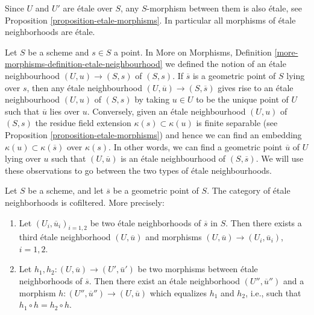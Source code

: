 \begin{remark}
\label{remark-etale-between-etale}
Since $U$ and $U'$ are \'etale over $S$, any $S$-morphism
between them is also \'etale, see
Proposition \ref{proposition-etale-morphisms}.
In particular all morphisms of \'etale neighborhoods are \'etale.
\end{remark}

\begin{remark}
\label{remark-etale-neighbourhoods}
Let $S$ be a scheme and $s \in S$ a point. In
More on Morphisms,
Definition \ref{more-morphisms-definition-etale-neighbourhood}
we defined the notion of an \'etale neighbourhood $(U, u) \to (S, s)$
of $(S, s)$. If $\overline{s}$ is a geometric point of $S$ lying over
$s$, then any \'etale neighbourhood $(U, \overline{u}) \to (S, \overline{s})$
gives rise to an \'etale neighbourhood $(U, u)$ of $(S, s)$ by taking
$u \in U$ to be the unique point of $U$ such that $\overline{u}$
lies over $u$. Conversely, given an \'etale neighbourhood $(U, u)$
of $(S, s)$ the residue field extension $\kappa(s) \subset \kappa(u)$
is finite separable (see
Proposition \ref{proposition-etale-morphisms})
and hence we can find an embedding $\kappa(u) \subset \kappa(\overline{s})$
over $\kappa(s)$. In other words, we can find a geometric point
$\overline{u}$ of $U$ lying over $u$ such that $(U, \overline{u})$
is an \'etale neighbourhood of $(S, \overline{s})$.
We will use these observations to go between the two types of
\'etale neighbourhoods.
\end{remark}

\begin{lemma}
\label{lemma-cofinal-etale}
Let $S$ be a scheme, and let $\overline{s}$ be a geometric point of $S$.
The category of \'etale neighborhoods is cofiltered. More precisely:
\begin{enumerate}
\item Let $(U_i, \overline{u}_i)_{i = 1, 2}$ be two \'etale neighborhoods of
$\overline{s}$ in $S$. Then there exists a third \'etale neighborhood
$(U, \overline{u})$ and morphisms
$(U, \overline{u}) \to (U_i, \overline{u}_i)$, $i = 1, 2$.
\item Let $h_1, h_2: (U, \overline{u}) \to (U', \overline{u}')$ be two
morphisms between \'etale neighborhoods of $\overline{s}$. Then there exist an
\'etale neighborhood $(U'', \overline{u}'')$ and a morphism
$h : (U'', \overline{u}'') \to (U, \overline{u})$
which equalizes $h_1$ and $h_2$, i.e., such that
$h_1 \circ h = h_2 \circ h$.
\end{enumerate}
\end{lemma}

